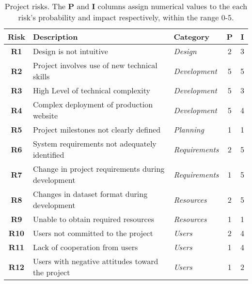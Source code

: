 \begin{table}[H]
\centering
\begin{tabular}{c l l c c}
\textbf{Risk} & \textbf{Description}                              & \textbf{Category}     & \textbf{P} & \textbf{I}\\
\hline
\textbf{R1}   & Design is not intuitive                           & \textit{Design}       & 2          & 3\\
\textbf{R2}   & Project involves use of new technical skills      & \textit{Development}  & 5          & 5\\
\textbf{R3}   & High Level of technical complexity                & \textit{Development}  & 5          & 3\\
\textbf{R4}   & Complex deployment of production website          & \textit{Development}  & 5          & 4\\
\textbf{R5}   & Project milestones not clearly defined            & \textit{Planning}     & 1          & 1\\
\textbf{R6}   & System requirements not adequately identified     & \textit{Requirements} & 2          & 5\\
\textbf{R7}   & Change in project requirements during development & \textit{Requirements} & 1          & 5\\
\textbf{R8}   & Changes in dataset format during development      & \textit{Resources}    & 2          & 5\\
\textbf{R9}   & Unable to obtain required resources               & \textit{Resources}    & 1          & 1\\
\textbf{R10}  & Users not committed to the project                & \textit{Users}        & 2          & 4\\
\textbf{R11}  & Lack of cooperation from users                    & \textit{Users}        & 1          & 4\\
\textbf{R12}  & Users with negative attitudes toward the project  & \textit{Users}        & 1          & 2\\
\end{tabular}
\caption[Project risks]
        {Project risks. The \textbf{P} and \textbf{I} columns assign
         numerical values to the each risk's probability and impact
         respectively, within the range 0-5.}
\label{tab:risks}
\end{table}
